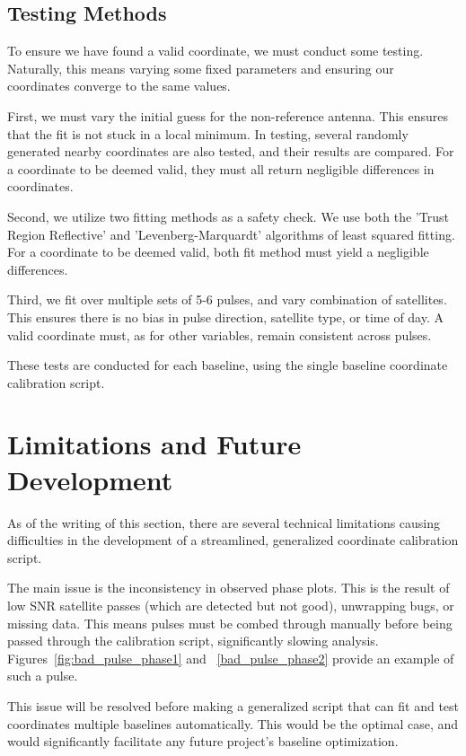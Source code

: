 \subsection{Testing Methods}

To ensure we have found a valid coordinate, we must conduct some testing. Naturally, this means varying some fixed parameters and ensuring our coordinates converge to the same values. 

First, we must vary the initial guess for the non-reference antenna. This ensures that the fit is not stuck in a local minimum. In testing, several randomly generated nearby coordinates are also tested, and their results are compared. For a coordinate to be deemed valid, they must all return negligible differences in coordinates.

Second, we utilize two fitting methods as a safety check. We use both the 'Trust Region Reflective' and 'Levenberg-Marquardt' algorithms of least squared fitting. For a coordinate to be deemed valid, both fit method must yield a negligible differences. 

Third, we fit over multiple sets of 5-6 pulses, and vary combination of satellites. This ensures there is no bias in pulse direction, satellite type, or time of day. A valid coordinate must, as for other variables, remain consistent across pulses.

These tests are conducted for each baseline, using the single baseline coordinate calibration script.




\section{Limitations and Future Development}
\label{sec:future}

As of the writing of this section, there are several technical limitations causing difficulties in the development of a streamlined, generalized coordinate calibration script.

The main issue is the inconsistency in observed phase plots. This is the result of low SNR satellite passes (which are detected but not good), unwrapping bugs, or missing data. This means pulses must be combed through manually before being passed through the calibration script, significantly slowing analysis. Figures~\ref{fig:bad_pulse_phase1} and ~\ref{bad_pulse_phase2} provide an example of such a pulse.

This issue will be resolved before making a generalized script that can fit and test coordinates multiple baselines automatically. This would be the optimal case, and would significantly facilitate any future project's baseline optimization.


